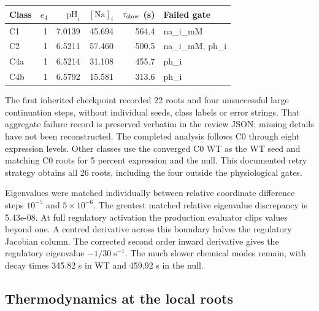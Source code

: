 \begin{center}\begin{tabular}{lrrrrl}\hline Class & $e_4$ & $\mathrm{pH}_i$ & $[\mathrm{Na}]_i$ & $\tau_{\rm slow}$ (s) & Failed gate\\\hline

C1 & 1 & 7.0139 & 45.694 & 564.4 & na\_i\_mM\\

C2 & 1 & 6.5211 & 57.460 & 500.5 & na\_i\_mM, ph\_i\\

C4a & 1 & 6.5214 & 31.108 & 455.7 & ph\_i\\

C4b & 1 & 6.5792 & 15.581 & 313.6 & ph\_i\\

\hline\end{tabular}\end{center}

The first inherited checkpoint recorded 22 roots and four unsuccessful large continuation steps, without individual seeds, class labels or error strings. That aggregate failure record is preserved verbatim in the review JSON; missing details have not been reconstructed. The completed analysis follows C0 through eight expression levels. Other classes use the converged C0 WT as the WT seed and matching C0 roots for 5 percent expression and the null. This documented retry strategy obtains all 26 roots, including the four outside the physiological gates.

Eigenvalues were matched individually between relative coordinate difference steps $10^{-5}$ and $5\times10^{-6}$. The greatest matched relative eigenvalue discrepancy is 5.43e-08. At full regulatory activation the production evaluator clips values beyond one. A centred derivative across this boundary halves the regulatory Jacobian column. The corrected second order inward derivative gives the regulatory eigenvalue $-1/30\;\mathrm{s}^{-1}$. The much slower chemical modes remain, with decay times 345.82 s in WT and 459.92 s in the null.

\subsection{Thermodynamics at the local roots}


